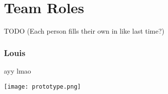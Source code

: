 \iffalse
Since we using git for our version control, and Github as our host for the project, we made use of Github's in-built issue tracking system. (Currently we use Trello to flag up issues, sometimes breaking our task board story-system by making a new card just for the issue. Using a dedicated system could help organise what problems we are having, in particular which issues are preventing further work from being completed. However, Github's 'Issues' feature isn't just restricted to bug fixes; it can be used for enhancements and keeping track of who is working on what, so it might be worth using this as an alternative, or in addition to Trello.) (Did we even use this?)
\fi

\section{Team Roles}
TODO (Each person fills their own in like last time?)

\subsubsection{Louis}
ayy lmao

\begin{center}
\texttt{[image: prototype.png]}
\end{center}
